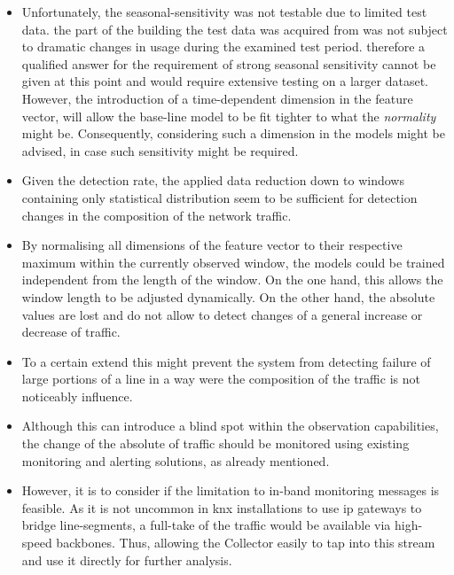 \begin{itemize}
	\item Unfortunately, the seasonal-sensitivity was not testable due to limited test data.
		\subitem the part of the building the test data was acquired from was not subject to dramatic changes in usage during the examined test period.
		\subitem therefore a qualified answer for the requirement of strong seasonal sensitivity cannot be given at this point and would require extensive testing on a larger dataset.
		\subitem However, the introduction of a time-dependent dimension in the feature vector, will allow the base-line model to be fit tighter to what the \emph{normality} might be. Consequently, considering such a dimension in the models might be advised, in case such sensitivity might be required.
		
	\item Given the detection rate, the applied data reduction down to windows containing only statistical distribution seem to be sufficient for detection changes in the composition of the network traffic.
	\item By normalising all dimensions of the feature vector to their respective maximum within the currently observed window, the models could be trained independent from the length of the window. On the one hand, this allows the window length to be adjusted dynamically.
	On the other hand, the absolute values are lost and do not allow to detect changes of a general increase or decrease of traffic. 
	\item To a certain extend this might prevent the system from detecting failure of large portions of a line in a way were the composition of the traffic is not noticeably influence.
	\item Although this can introduce a blind spot within the observation capabilities, the change of the absolute of traffic should be monitored using existing monitoring and alerting solutions, as already mentioned.
	
	\item However, it is to consider if the limitation to in-band monitoring messages is feasible. As it is not uncommon in \gls{knx} installations to use \gls{ip} gateways to bridge line-segments, a full-take of the traffic would be available via high-speed backbones. Thus, allowing the Collector easily to tap into this stream and use it directly for further analysis.
		

\end{itemize}
